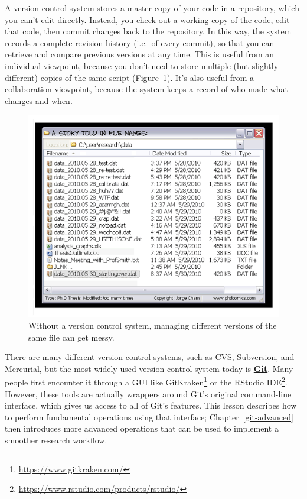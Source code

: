 \documentclass[
]{krantz}
\renewcommand{\href}[2]{#2\footnote{\url{#1}}}
\newcommand{\gref}[2]{\hyperlink{#2}{\textbf{#1}}}
\begin{document}
A version control system stores a master copy of your code in a repository,
which you can't edit directly.
Instead, you check out a working copy of the code,
edit that code, then commit changes back to the repository.
In this way, the system records a complete revision history (i.e.~of every commit),
so that you can retrieve and compare previous versions at any time.
This is useful from an individual viewpoint,
because you don't need to store multiple (but slightly different) copies of the same script
(Figure~\ref{fig:git-cmdline-phdcomics}).
It's also useful from a collaboration viewpoint,
because the system keeps a record of who made what changes and when.

\begin{figure}

{\centering \includegraphics[width=1\linewidth]{figures/git-cmdline/phd-comics} 

}

\caption{Without a version control system, managing different versions of the same file can get messy.}\label{fig:git-cmdline-phdcomics}
\end{figure}

There are many different version control systems,
such as CVS, Subversion, and Mercurial,
but the most widely used version control system today is \gref{Git}{git}.
Many people first encounter it through a GUI like \href{https://www.gitkraken.com/}{GitKraken}
or \href{https://www.rstudio.com/products/rstudio/}{the RStudio IDE}.
However,
these tools are actually wrappers around Git's original command-line interface,
which gives us access to all of Git's features.
This lesson describes how to perform fundamental operations using that interface;
Chapter~\ref{git-advanced} then introduces more advanced operations
that can be used to implement a smoother research workflow.
\end{document}
